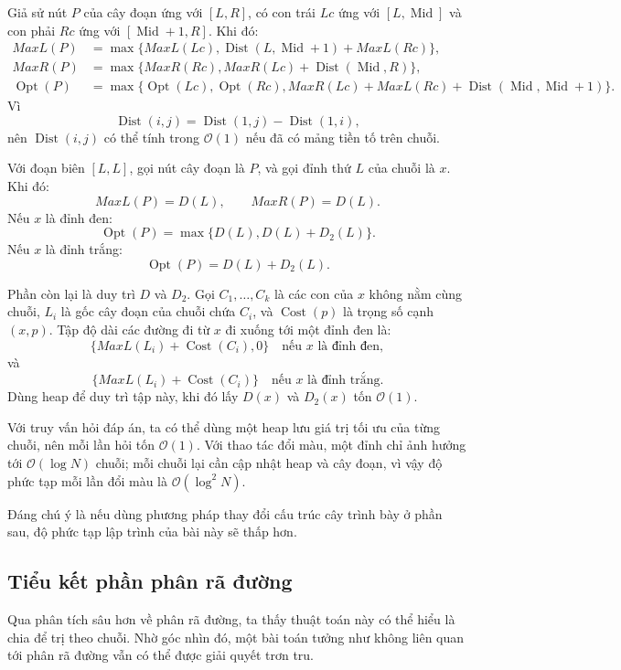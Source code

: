 \documentclass[11pt]{article}
\newcommand{\Oh}{\mathcal{O}}
\newcommand{\Cost}{\operatorname{Cost}}
\newcommand{\Opt}{\operatorname{Opt}}
\newcommand{\Mid}{\operatorname{Mid}}
\newcommand{\Dist}{\operatorname{Dist}}
\begin{document}
Giả sử nút \(P\) của cây đoạn ứng với \([L,R]\), có con trái \(Lc\) ứng với
\([L,\Mid]\) và con phải \(Rc\) ứng với \([\Mid+1,R]\). Khi đó:
\[
\begin{aligned}
  \mathit{MaxL}(P)
    &=\max\{\mathit{MaxL}(Lc),
      \Dist(L,\Mid+1)+\mathit{MaxL}(Rc)\},\\
  \mathit{MaxR}(P)
    &=\max\{\mathit{MaxR}(Rc),
      \mathit{MaxR}(Lc)+\Dist(\Mid,R)\},\\
  \Opt(P)
    &=\max\{\Opt(Lc),\Opt(Rc),
      \mathit{MaxR}(Lc)+\mathit{MaxL}(Rc)+\Dist(\Mid,\Mid+1)\}.
\end{aligned}
\]
Vì
\[
  \Dist(i,j)=\Dist(1,j)-\Dist(1,i),
\]
nên \(\Dist(i,j)\) có thể tính trong \(\Oh(1)\) nếu đã có mảng tiền tố trên
chuỗi.

Với đoạn biên \([L,L]\), gọi nút cây đoạn là \(P\), và gọi đỉnh thứ \(L\) của
chuỗi là \(x\). Khi đó:
\[
  \mathit{MaxL}(P)=D(L),\qquad \mathit{MaxR}(P)=D(L).
\]
Nếu \(x\) là đỉnh đen:
\[
  \Opt(P)=\max\{D(L),D(L)+D_2(L)\}.
\]
Nếu \(x\) là đỉnh trắng:
\[
  \Opt(P)=D(L)+D_2(L).
\]

Phần còn lại là duy trì \(D\) và \(D_2\). Gọi \(C_1,\ldots,C_k\) là các con
của \(x\) không nằm cùng chuỗi, \(L_i\) là gốc cây đoạn của chuỗi chứa
\(C_i\), và \(\Cost(p)\) là trọng số cạnh \((x,p)\). Tập độ dài các đường đi
từ \(x\) đi xuống tới một đỉnh đen là:
\[
  \{\mathit{MaxL}(L_i)+\Cost(C_i),0\}\quad\text{nếu }x\text{ là đỉnh đen},
\]
và
\[
  \{\mathit{MaxL}(L_i)+\Cost(C_i)\}\quad\text{nếu }x\text{ là đỉnh trắng}.
\]
Dùng heap để duy trì tập này, khi đó lấy \(D(x)\) và \(D_2(x)\) tốn
\(\Oh(1)\).

Với truy vấn hỏi đáp án, ta có thể dùng một heap lưu giá trị tối ưu của từng
chuỗi, nên mỗi lần hỏi tốn \(\Oh(1)\). Với thao tác đổi màu, một đỉnh chỉ ảnh
hưởng tới \(\Oh(\log N)\) chuỗi; mỗi chuỗi lại cần cập nhật heap và cây đoạn,
vì vậy độ phức tạp mỗi lần đổi màu là \(\Oh(\log^2 N)\).

Đáng chú ý là nếu dùng phương pháp thay đổi cấu trúc cây trình bày ở phần sau,
độ phức tạp lập trình của bài này sẽ thấp hơn.

\subsection{Tiểu kết phần phân rã đường}

Qua phân tích sâu hơn về phân rã đường, ta thấy thuật toán này có thể hiểu là
chia để trị theo chuỗi. Nhờ góc nhìn đó, một bài toán tưởng như không liên
quan tới phân rã đường vẫn có thể được giải quyết trơn tru.
\end{document}
